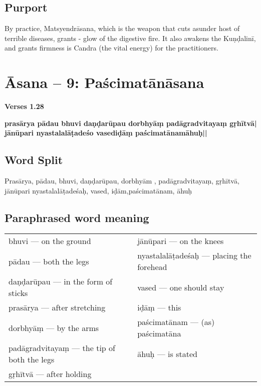 \subsection*{Purport}

By practice, Matsyendrāsana, which is the weapon that cuts asunder host of terrible diseases, grants - glow of the digestive fire. It also awakens the  Kuṇḍalinī, and grants firmness is Candra (the vital energy) for the practitioners.
\newpage

\section*{Āsana -- 9: Paścimatānāsana}

\noindent 
\textbf{Verses 1.28}

\begin{shloka}
\textbf{prasārya pādau bhuvi daṇḍarūpau dorbhyāṃ padāgradvitayaṃ gṛhītvā|}\\
\textbf{jānūpari nyastalalāṭadeśo vasediḍāṃ paścimatānamāhuḥ||}
\end{shloka}
\vspace{-10pt}

\subsection*{Word Split}
\vspace{-10pt}

Prasārya, pādau, bhuvi, daṇḍarūpau, dorbhyām , padāgradvitayaṃ, gṛhītvā, jānūpari nyastalalāṭadeśaḥ,  vased, iḍām,paścimatānam, āhuḥ

\subsection*{Paraphrased word meaning}
\vspace{-10pt}

\begin{longtable}{>{\noindent\raggedright}p{5cm}>{\noindent\raggedright}p{5cm}}
bhuvi --- on the ground & jānūpari --- on the knees\tabularnewline
pādau --- both the legs  & nyastalalāṭadeśaḥ --- placing the forehead\tabularnewline
daṇḍarūpau --- in the form of sticks  & vased --- one should stay\tabularnewline
prasārya --- after stretching  & iḍāṃ --- this\tabularnewline
dorbhyāṃ --- by the arms  & paścimatānam --- (as) paścimatāna\tabularnewline
padāgradvitayaṃ --- the tip of both the legs  & āhuḥ --- is stated \tabularnewline
gṛhītvā --- after holding & 
\end{longtable}
\vspace{-10pt}

